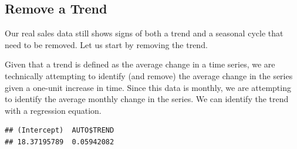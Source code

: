 \documentclass[
]{book}
\newenvironment{Shaded}{\begin{snugshade}}{\end{snugshade}}
\newcommand{\AttributeTok}[1]{\textcolor[rgb]{0.77,0.63,0.00}{#1}}
\newcommand{\DecValTok}[1]{\textcolor[rgb]{0.00,0.00,0.81}{#1}}
\newcommand{\FunctionTok}[1]{\textcolor[rgb]{0.00,0.00,0.00}{#1}}
\newcommand{\NormalTok}[1]{#1}
\newcommand{\OtherTok}[1]{\textcolor[rgb]{0.56,0.35,0.01}{#1}}
\newcommand{\SpecialCharTok}[1]{\textcolor[rgb]{0.00,0.00,0.00}{#1}}
\begin{document}
\hypertarget{remove-a-trend}{%
\subsection*{Remove a Trend}\label{remove-a-trend}}

Our real sales data still shows signs of both a trend and a seasonal cycle that need to be removed. Let us start by removing the trend.

Given that a trend is defined as the average change in a time series, we are technically attempting to identify (and remove) the average change in the series given a one-unit increase in time. Since this data is monthly, we are attempting to identify the average monthly change in the series. We can identify the trend with a regression equation.

\begin{Shaded}
\end{Shaded}

\begin{verbatim}
## (Intercept)  AUTO$TREND 
## 18.37195789  0.05942082
\end{verbatim}
\end{document}
